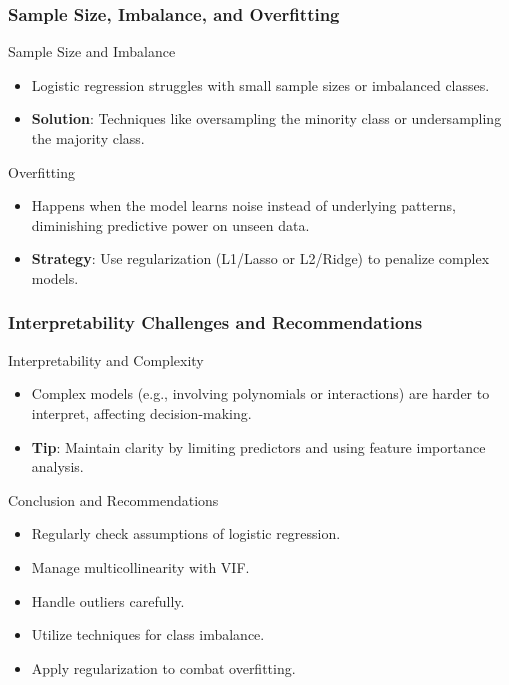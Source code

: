 \documentclass[aspectratio=169]{beamer}
\begin{document}
\begin{frame}[fragile]
  \frametitle{Sample Size, Imbalance, and Overfitting}
  \begin{block}{Sample Size and Imbalance}
    \begin{itemize}
      \item Logistic regression struggles with small sample sizes or imbalanced classes.
      \item \textbf{Solution}: Techniques like oversampling the minority class or undersampling the majority class.
    \end{itemize}
  \end{block}

  \begin{block}{Overfitting}
    \begin{itemize}
      \item Happens when the model learns noise instead of underlying patterns, diminishing predictive power on unseen data.
      \item \textbf{Strategy}: Use regularization (L1/Lasso or L2/Ridge) to penalize complex models.
    \end{itemize}
  \end{block}
\end{frame}

\begin{frame}[fragile]
  \frametitle{Interpretability Challenges and Recommendations}
  \begin{block}{Interpretability and Complexity}
    \begin{itemize}
      \item Complex models (e.g., involving polynomials or interactions) are harder to interpret, affecting decision-making.
      \item \textbf{Tip}: Maintain clarity by limiting predictors and using feature importance analysis.
    \end{itemize}
  \end{block}

  \begin{block}{Conclusion and Recommendations}
    \begin{itemize}
      \item Regularly check assumptions of logistic regression.
      \item Manage multicollinearity with VIF.
      \item Handle outliers carefully.
      \item Utilize techniques for class imbalance.
      \item Apply regularization to combat overfitting.
    \end{itemize}
  \end{block}
\end{frame}
\end{document}
